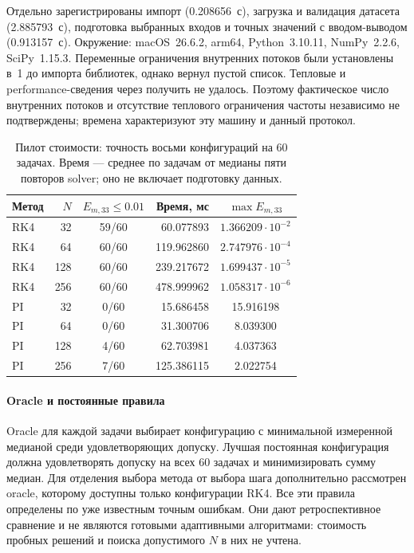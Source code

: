 Отдельно зарегистрированы импорт (0.208656~с), загрузка и валидация
датасета (2.885793~с), подготовка выбранных входов и точных значений
с вводом-выводом (0.913157~с). Окружение: macOS~26.6.2, arm64,
Python~3.10.11, NumPy~2.2.6, SciPy~1.15.3. Переменные ограничения
внутренних потоков были установлены в~1 до импорта библиотек, однако
 вернул пустой список. Тепловые и performance-сведения
через  получить не удалось. Поэтому фактическое число
внутренних потоков и отсутствие теплового ограничения частоты независимо
не подтверждены; времена характеризуют эту машину и данный протокол.

\begin{table}[!htbp]
\centering
\caption{Пилот стоимости: точность восьми конфигураций на 60 задачах.
Время --- среднее по задачам от медианы пяти повторов solver;
оно не включает подготовку данных.}
\label{tab:costpilot-configurations}
\small
\begin{tabular}{lrcrc}
\toprule
Метод & $N$ & $E_{m,33}\le0.01$ & Время, мс & $\max E_{m,33}$\\
\midrule
RK4 & 32  & 59/60 & 60.077893  & $1.366209\cdot10^{-2}$\\
RK4 & 64  & 60/60 & 119.962860 & $2.747976\cdot10^{-4}$\\
RK4 & 128 & 60/60 & 239.217672 & $1.699437\cdot10^{-5}$\\
RK4 & 256 & 60/60 & 478.999962 & $1.058317\cdot10^{-6}$\\
PI  & 32  & 0/60  & 15.686458  & 15.916198\\
PI  & 64  & 0/60  & 31.300706  & 8.039300\\
PI  & 128 & 4/60  & 62.703981  & 4.037363\\
PI  & 256 & 7/60  & 125.386115 & 2.022754\\
\bottomrule
\end{tabular}
\end{table}

\paragraph{Oracle и постоянные правила\\}
Oracle для каждой задачи выбирает конфигурацию с минимальной измеренной
медианой среди удовлетворяющих допуску. Лучшая постоянная конфигурация
должна удовлетворять допуску на всех 60 задачах и минимизировать сумму
медиан. Для отделения выбора метода от выбора шага дополнительно
рассмотрен oracle, которому доступны только конфигурации RK4.
Все эти правила определены по уже известным точным ошибкам. Они дают
ретроспективное сравнение и не являются готовыми адаптивными алгоритмами:
стоимость пробных решений и поиска допустимого $N$ в них не учтена.

